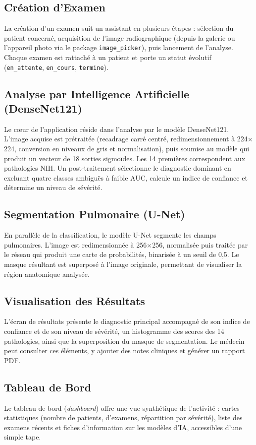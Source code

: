 \documentclass[12pt,a4paper]{report}
\begin{document}
\subsection{Création d'Examen}
La création d'un examen suit un assistant en plusieurs étapes : sélection du patient concerné, acquisition de l'image radiographique (depuis la galerie ou l'appareil photo via le package \texttt{image\_picker}), puis lancement de l'analyse. Chaque examen est rattaché à un patient et porte un statut évolutif (\texttt{en\_attente}, \texttt{en\_cours}, \texttt{termine}).

\subsection{Analyse par Intelligence Artificielle (DenseNet121)}
Le cœur de l'application réside dans l'analyse par le modèle DenseNet121. L'image acquise est prétraitée (recadrage carré centré, redimensionnement à 224$\times$224, conversion en niveaux de gris et normalisation), puis soumise au modèle qui produit un vecteur de 18 sorties sigmoïdes. Les 14 premières correspondent aux pathologies NIH. Un post-traitement sélectionne le diagnostic dominant en excluant quatre classes ambiguës à faible AUC, calcule un indice de confiance et détermine un niveau de sévérité.

\subsection{Segmentation Pulmonaire (U-Net)}
En parallèle de la classification, le modèle U-Net segmente les champs pulmonaires. L'image est redimensionnée à 256$\times$256, normalisée puis traitée par le réseau qui produit une carte de probabilités, binarisée à un seuil de 0,5. Le masque résultant est superposé à l'image originale, permettant de visualiser la région anatomique analysée.

\subsection{Visualisation des Résultats}
L'écran de résultats présente le diagnostic principal accompagné de son indice de confiance et de son niveau de sévérité, un histogramme des scores des 14 pathologies, ainsi que la superposition du masque de segmentation. Le médecin peut consulter ces éléments, y ajouter des notes cliniques et générer un rapport PDF.

\subsection{Tableau de Bord}
Le tableau de bord (\textit{dashboard}) offre une vue synthétique de l'activité : cartes statistiques (nombre de patients, d'examens, répartition par sévérité), liste des examens récents et fiches d'information sur les modèles d'IA, accessibles d'une simple tape.
\end{document}
